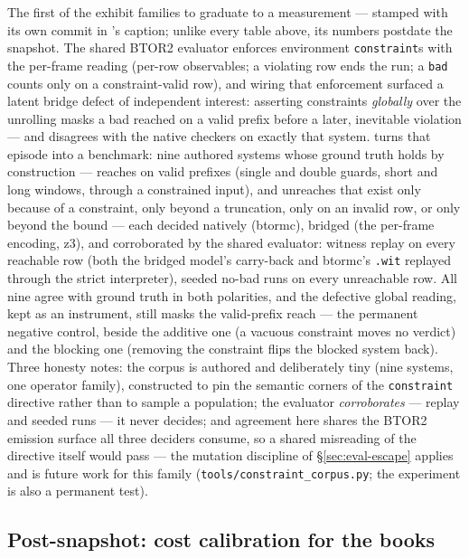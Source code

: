 The first of the exhibit families to graduate to a measurement ---
stamped with its own commit in 's caption; unlike
every table above, its numbers postdate the snapshot. The shared BTOR2
evaluator enforces environment \texttt{constraint}s with the per-frame
reading (per-row observables; a violating row ends the run; a
\texttt{bad} counts only on a constraint-valid row), and wiring that
enforcement surfaced a latent bridge defect of independent interest:
asserting constraints \emph{globally} over the unrolling masks a bad
reached on a valid prefix before a later, inevitable violation --- and
disagrees with the native checkers on exactly that system.
 turns that episode into a benchmark: nine
authored systems whose ground truth holds by construction --- reaches
on valid prefixes (single and double guards, short and long windows,
through a constrained input), and unreaches that exist only because of
a constraint, only beyond a truncation, only on an invalid row, or
only beyond the bound --- each decided natively (btormc), bridged
(the per-frame encoding, z3), and corroborated by the shared
evaluator: witness replay on every reachable row (both the bridged
model's carry-back and btormc's \texttt{.wit} replayed through the
strict interpreter), seeded no-bad runs on every unreachable row. All
nine agree with ground truth in both polarities, and the defective
global reading, kept as an instrument, still masks the valid-prefix
reach --- the permanent negative control, beside the additive one (a
vacuous constraint moves no verdict) and the blocking one (removing
the constraint flips the blocked system back). Three honesty notes:
the corpus is authored and deliberately tiny (nine systems, one
operator family), constructed to pin the semantic corners of the
\texttt{constraint} directive rather than to sample a population; the
evaluator \emph{corroborates} --- replay and seeded runs --- it never
decides; and agreement here shares the BTOR2 emission surface all
three deciders consume, so a shared misreading of the directive itself
would pass --- the mutation discipline of \S\ref{sec:eval-escape}
applies and is future work for this family
(\texttt{tools/constraint\_corpus.py}; the experiment is also a
permanent test).

\subsection{Post-snapshot: cost calibration for the books}
\label{sec:eval-costs}

